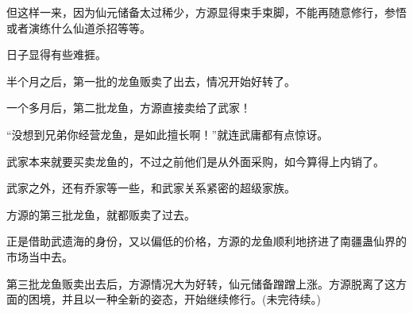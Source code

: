 \begin{this_body}
但这样一来，因为仙元储备太过稀少，方源显得束手束脚，不能再随意修行，参悟或者演练什么仙道杀招等等。

日子显得有些难捱。

半个月之后，第一批的龙鱼贩卖了出去，情况开始好转了。

一个多月后，第二批龙鱼，方源直接卖给了武家！

“没想到兄弟你经营龙鱼，是如此擅长啊！”就连武庸都有点惊讶。

武家本来就要买卖龙鱼的，不过之前他们是从外面采购，如今算得上内销了。

武家之外，还有乔家等一些，和武家关系紧密的超级家族。

方源的第三批龙鱼，就都贩卖了过去。

正是借助武遗海的身份，又以偏低的价格，方源的龙鱼顺利地挤进了南疆蛊仙界的市场当中去。

第三批龙鱼贩卖出去后，方源情况大为好转，仙元储备蹭蹭上涨。方源脱离了这方面的困境，并且以一种全新的姿态，开始继续修行。(未完待续。)

\end{this_body}

